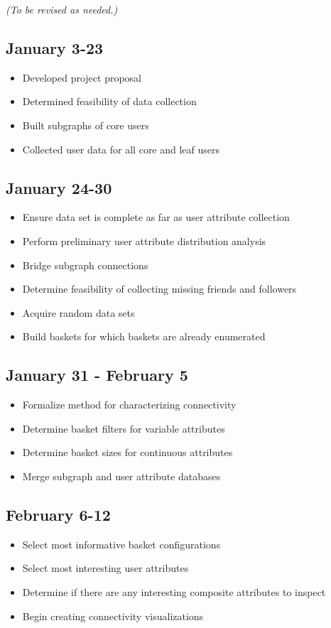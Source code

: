 \textit{(To be revised as needed.)}

\subsection*{January 3-23}
\begin{itemize}
\item{Developed project proposal}
\item{Determined feasibility of data collection}
\item{Built subgraphs of core users}
\item{Collected user data for all core and leaf users}
\end{itemize}

\subsection*{January 24-30}
\begin{itemize}
\item{Ensure data set is complete as far as user attribute collection}
\item{Perform preliminary user attribute distribution analysis}
\item{Bridge subgraph connections}
\item{Determine feasibility of collecting missing friends and followers}
\item{Acquire random data sets}
\item{Build baskets for which baskets are already enumerated}
\end{itemize}

\subsection*{January 31 - February 5}
\begin{itemize}
\item{Formalize method for characterizing connectivity}
\item{Determine basket filters for variable attributes}
\item{Determine basket sizes for continuous attributes}
\item{Merge subgraph and user attribute databases}
\end{itemize}

\subsection*{February 6-12}
\begin{itemize}
\item{Select most informative basket configurations}
\item{Select most interesting user attributes}
\item{Determine if there are any interesting composite attributes to inspect}
\item{Begin creating connectivity visualizations}
\end{itemize}

